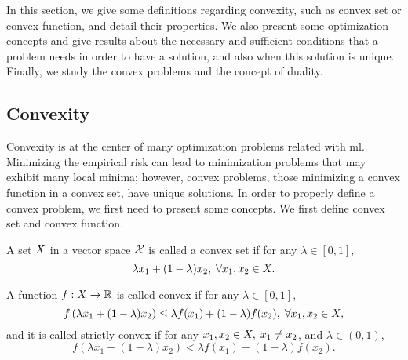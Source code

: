 In this section, we give some definitions regarding convexity, such as convex set or convex function, and detail their properties.
%
We also present some optimization concepts and give results about the necessary and sufficient conditions that a problem needs in order to have a solution, and also when this solution is unique.
%
Finally, we study the convex problems and the concept of duality.






\subsection{Convexity}
Convexity is at the center of many optimization problems related with \acrshort{ml}.
Minimizing the empirical risk can lead to minimization problems that may exhibit many local minima; however, convex problems, those minimizing a convex function in a convex set, have unique solutions.
In order to properly define a convex problem, we first need to present some concepts.  
We first define convex set and convex function.
\begin{definition}
    A set $X$ in a vector space $\mathcal{X}$ is called a convex set if for any $\lambda \in [0, 1]$,
    \begin{equation}
        \nonumber
        \lambda x_1 + (1 - \lambda) x_2 , \; \forall x_1, x_2 \in X .
    \end{equation}
\end{definition}

\begin{definition}
    A function $f: X \to \mathbb{R}$ is called convex if for any $\lambda \in [0, 1]$,
    \begin{equation}
        \nonumber
        f\left(\lambda x_1 + (1 - \lambda) x_2 \right) \leq \lambda f(x_1) + (1 - \lambda) f(x_2) , \; \forall x_1, x_2 \in X ,
    \end{equation}
    and it is called strictly convex if for any $x_1, x_2 \in X, \; x_1 \neq x_2$, and $\lambda \in (0, 1)$,
    \begin{equation}
        \nonumber
        f\left(\lambda x_1 + (1 - \lambda) x_2 \right) < \lambda f(x_1) + (1 - \lambda) f(x_2) .
    \end{equation}
\end{definition}

